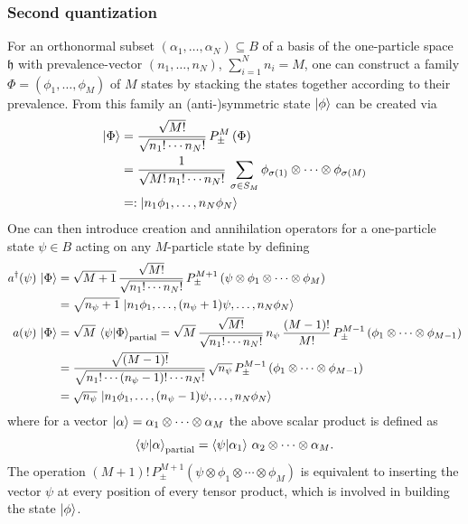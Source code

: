 \subsubsection{Second quantization}\label{sec:second_quantization}

For an orthonormal subset $(\alpha_1,\dots,\alpha_N)\subseteq B$ of a basis of the one-particle space $\mathfrak{h}$ with prevalence-vector $(n_1,\dots,n_N)$, $\sum_{i=1}^N n_i=M$, one can construct a family $\Phi=(\phi_1,\dots,\phi_M)$ of $M$ states by stacking the states together according to their prevalence. From this family an (anti-)symmetric state $\ket{\phi}$ can be created via
\begin{align}\label{eq:fock_state}
    \ket{\Phi}&= \frac{\sqrt{M!}}{\sqrt{n_1!\cdots n_N!}}\,P_\pm^M\left( \Phi\right)\notag\\
    &=\frac{1}{\sqrt{M!\,n_1!\cdots n_N!}}\,\sum_{\sigma\in S_M} \phi_{\sigma(1)}\otimes\cdots\otimes\phi_{\sigma(M)}\\
    &=:\ket{n_1\phi_1,\dots,n_N\phi_N}\notag
\end{align}
One can then introduce creation and annihilation operators for a one-particle state $\psi\in B$ acting on any $M$-particle state by defining
\begin{align*}
    a^\dagger(\psi)\,\ket{\Phi}&=\sqrt{M+1}\, \frac{\sqrt{M!}}{\sqrt{n_1!\cdots n_N!}}\,P_\pm^{M+1}\left(\psi\otimes \phi_1 \otimes \cdots\otimes\phi_M \right)\\
    &=\sqrt{n_\psi+1}\,\ket{n_1\phi_1,\dots,(n_\psi+1)\psi,\dots,n_N\phi_N}\\
    a(\psi)\,\ket{\Phi}&= \sqrt{M}\,\braket{\psi|\Phi}_\text{partial}=\sqrt{M}\,\frac{\sqrt{M!}}{\sqrt{n_1!\cdots n_N!}}\,n_\psi\,\frac{(M-1)!}{M!}\,P_\pm^{M-1}\left(\phi_1 \otimes \cdots\otimes\phi_{M-1} \right)\\
    &=\frac{\sqrt{(M-1)!}}{\sqrt{n_1!\cdots (n_\psi-1)!\cdots n_N!}}\,\sqrt{n_\psi}\,P_\pm^{M-1}\left(\phi_1 \otimes \cdots\otimes\phi_{M-1} \right)\\
    &=\sqrt{n_\psi}\,\ket{n_1\phi_1,\dots,(n_\psi-1)\psi,\dots,n_N\phi_N}
\end{align*}
where for a vector $\ket{\alpha}=\alpha_1\otimes\cdots\otimes\alpha_M$ the above scalar product is defined as $$\braket{\psi|\alpha}_\text{partial}=\braket{\psi|\alpha_1}\,\alpha_2\otimes\cdots\otimes\alpha_M.$$
The operation $(M+1)!\,P_\pm^{M+1}\left(\psi\otimes \phi_1 \otimes \cdots\otimes\phi_M \right)$ is equivalent to inserting the vector $\psi$ at every position of every tensor product, which is involved in building the state $\ket{\phi}$. 
